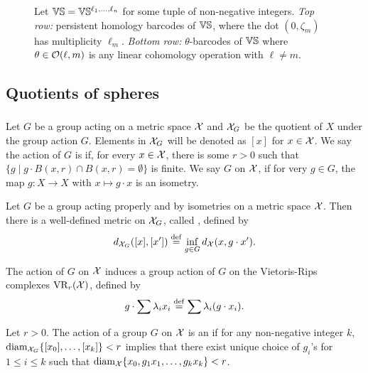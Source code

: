 \begin{figure}
	\centering
	
	\caption{Let $\mathbb{V}\mathbb{S} = \mathbb{V}\mathbb{S}^{\ell_1,\dots,\ell_n}$ for some tuple of non-negative integers.
	\emph{Top row:} persistent homology barcodes of $\mathbb{V}\mathbb{S}$, where the dot $(0,\zeta_m)$ has multiplicity $\ell_m$.
	\emph{Bottom row:} $\theta$-barcodes of $\mathbb{V}\mathbb{S}$ where $\theta \in \mathcal{O}(\ell,m)$ is any linear cohomology operation with \(\ell \neq m\).}
	\label{fig:barcodes_vs}
\end{figure}


\subsection{Quotients of spheres}

\subsubsection{}


Let $G$ be a group acting on a metric space $\mathcal{X}$ and $\mathcal{X}_G$ be the quotient of $X$ under the group action $G$. 
Elements in $\mathcal{X}_G$ will be denoted as $[x]$ for $x\in \mathcal{X}$.
We say the action of $G$ is  if, for every $x\in \mathcal{X}$, there is some $r>0$ such that $\{g \mid g\cdot B(x,r)\cap B(x,r)=\emptyset\}$ is finite. 
We say $G$  on $\mathcal{X}$, if for very $g\in G$, the map $g:X\to X$ with $x\mapsto g\cdot x$ is an isometry.

Let $G$ be a group acting properly and by isometries on a metric space $\mathcal{X}$.
Then there is a well-defined metric on $\mathcal{X}_G$, called , defined by 
\[
    d_{\mathcal{X}_G}([x], [x']) \stackrel{\mathrm{def}}{=} \inf_{g\in G} d_{\mathcal{X}}(x, g\cdot x').
\]

The action of $G$ on $\mathcal{X}$ induces a group action of $G$ on the Vietoris-Rips complexes $\operatorname{VR}_r(\mathcal{X})$, defined by
\[
    g \cdot \sum \lambda_i x_i \stackrel{\mathrm{def}}{=} \sum \lambda_i (g\cdot x_i).
\]

Let $r>0$. The action of a group $G$ on $\mathcal{X}$ is an  if for any non-negative integer $k$, $\operatorname{diam}_{\mathcal{X}_G}\{[x_0],\dots,[x_k]\}<r$ implies that there exist unique choice of $g_i$'s for $1\leq i\leq k$ such that $\operatorname{diam}_{\mathcal{X}}\{x_0,g_1x_1,\dots,g_kx_k\}<r$. 

